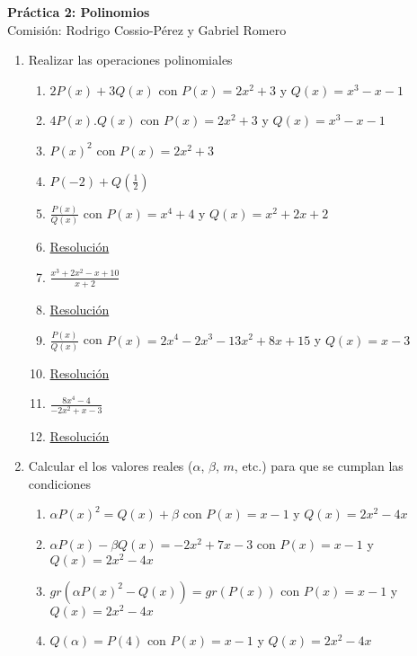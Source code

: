 \documentclass[a4paper]{article}
\newcommand{\answer}{\item[**]}
\newcommand{\exercise}{\item}
\newcommand{\df}[2]{\displaystyle\frac{#1}{#2}}
\begin{document}
\noindent \hrulefill 
\vspace{-7pt}
\begin{center} 
	\textbf{ Práctica 2: Polinomios } \\
	Comisión: Rodrigo Cossio-Pérez y Gabriel Romero
\end{center}
\vspace{-10pt}
\hrulefill


\begin{enumerate}

	\exercise Realizar las operaciones polinomiales
	\begin{multicols}{2}
	\begin{enumerate} [label=(\alph*)]
		
		\item $2P(x)+3Q(x)$ con $P(x)=2x^2+3$ y $Q(x)=x^3-x-1$
		\item $4P(x).Q(x)$ con $P(x)=2x^2+3$ y $Q(x)=x^3-x-1$
		\item $P(x)^2$ con $P(x)=2x^2+3$
		\item $P(-2)+Q\left(\df{1}{2}\right)$

		\item $\df{P(x)}{Q(x)}$ con $P(x)=x^4+4$ y $Q(x)=x^2+2x+2$
		\answer \href{https://youtu.be/DWDi7BKAKbc}{Resolución}

		\item $\df{x^3+2x^2-x+10}{x+2}$
		\answer \href{https://youtu.be/bfCWsvZfFq0}{Resolución}

		\item $\df{P(x)}{Q(x)}$ con $P(x)=2x^4-2x^3-13x^2+8x+15$ y $Q(x)=x-3$
		\answer \href{https://youtu.be/W3HcTD4IC94}{Resolución}

		\item $\df{8x^4-4}{-2x^2+x-3}$
		\answer \href{https://youtu.be/0Dw3MAwrA34}{Resolución}

	\end{enumerate}
	\end{multicols}

	\exercise Calcular el los valores reales ($\alpha$, $\beta$, $m$, etc.) para que se cumplan las condiciones

	\begin{multicols}{2}
	\begin{enumerate} [label=(\alph*)]
		
		\item $\alpha P(x)^2 = Q(x) +\beta$ con $P(x)=x-1$ y $Q(x)=2x^2-4x$
		\item $\alpha P(x)-\beta Q(x) = -2x^2 +7x-3$ con $P(x)=x-1$ y $Q(x)=2x^2-4x$
		\item $gr\left(\alpha P(x)^2 - Q(x)\right)=gr\left(P(x)\right)$ con $P(x)=x-1$ y $Q(x)=2x^2-4x$
		\item $Q(\alpha)=P(4)$ con $P(x)=x-1$ y $Q(x)=2x^2-4x$


\end{enumerate}
\end{multicols}
\end{enumerate}
\end{document}

